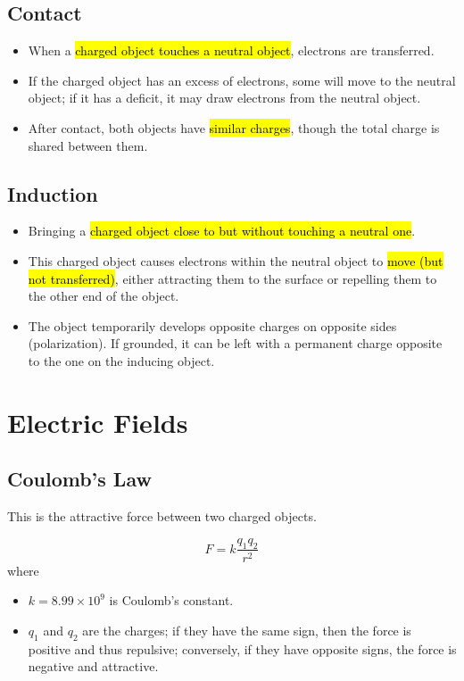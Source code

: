 \documentclass[a4paper,12pt]{article}
\let\oldsection\section
\renewcommand\section{\clearpage\oldsection}
\begin{document}
\subsection{Contact}

\begin{itemize}
  \item When a \hl{charged object touches a neutral object}, electrons are transferred.
  \item If the charged object has an excess of electrons, some will move to the neutral object; if it has a deficit, it may draw electrons from the neutral object.
  \item After contact, both objects have \hl{similar charges}, though the total charge is shared between them.
\end{itemize}

\subsection{Induction}
\begin{itemize}
  \item Bringing a \hl{charged object close to but without touching a neutral one}.
  \item This charged object causes electrons within the neutral object to \hl{move (but not transferred)}, either attracting them to the surface or repelling them to the other end of the object.
  \item The object temporarily develops opposite charges on opposite sides (polarization). If grounded, it can be left with a permanent charge opposite to the one on the inducing object.
\end{itemize}

\section{Electric Fields}

\subsection{Coulomb's Law}

This is the attractive force between two charged objects.

\begin{equation}\label{eq:coulomb}
  F = k\frac{q_1q_2}{r^2}
\end{equation}
where
\begin{itemize}
  \item $k = 8.99 \times 10^9$ is Coulomb's constant.
  \item $q_1$ and $q_2$ are the charges; if they have the same sign, then the force is positive and thus repulsive; conversely, if they have opposite signs, the force is negative and attractive.
\end{itemize}
\end{document}
